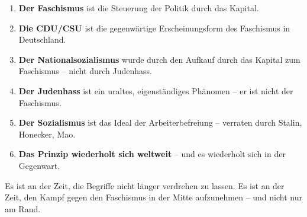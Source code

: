 \begin{enumerate}
    \item \textbf{Der Faschismus} ist die Steuerung der Politik durch das Kapital.
    \item \textbf{Die CDU/CSU} ist die gegenwärtige Erscheinungsform des Faschismus in Deutschland.
    \item \textbf{Der Nationalsozialismus} wurde durch den Aufkauf durch das Kapital zum Faschismus -- nicht durch Judenhass.
    \item \textbf{Der Judenhass} ist ein uraltes, eigenständiges Phänomen -- er ist nicht der Faschismus.
    \item \textbf{Der Sozialismus} ist das Ideal der Arbeiterbefreiung -- verraten durch Stalin, Honecker, Mao.
    \item \textbf{Das Prinzip wiederholt sich weltweit} -- und es wiederholt sich in der Gegenwart.
\end{enumerate}

Es ist an der Zeit, die Begriffe nicht länger verdrehen zu lassen. Es ist an der Zeit, den Kampf gegen den Faschismus in der Mitte aufzunehmen -- und nicht nur am Rand.